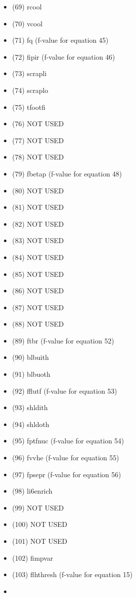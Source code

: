 \documentclass[
]{article}
\begin{document}
\begin{itemize}
\begin{itemize}
    (68) fptemp (f-value for equation 44)
  \item
    (69) rcool
  \item
    (70) vcool
  \item
    (71) fq (f-value for equation 45)
  \item
    (72) fipir (f-value for equation 46)
  \item
    (73) scrapli
  \item
    (74) scraplo
  \item
    (75) tfootfi
  \item
    (76) NOT USED
  \item
    (77) NOT USED
  \item
    (78) NOT USED
  \item
    (79) fbetap (f-value for equation 48)
  \item
    (80) NOT USED
  \item
    (81) NOT USED
  \item
    (82) NOT USED
  \item
    (83) NOT USED
  \item
    (84) NOT USED
  \item
    (85) NOT USED
  \item
    (86) NOT USED
  \item
    (87) NOT USED
  \item
    (88) NOT USED
  \item
    (89) ftbr (f-value for equation 52)
  \item
    (90) blbuith
  \item
    (91) blbuoth
  \item
    (92) fflutf (f-value for equation 53)
  \item
    (93) shldith
  \item
    (94) shldoth
  \item
    (95) fptfnuc (f-value for equation 54)
  \item
    (96) fvvhe (f-value for equation 55)
  \item
    (97) fpsepr (f-value for equation 56)
  \item
    (98) li6enrich
  \item
    (99) NOT USED
  \item
    (100) NOT USED
  \item
    (101) NOT USED
  \item
    (102) fimpvar
  \item
    (103) flhthresh (f-value for equation 15)
  \item

\end{itemize}
\end{itemize}
\end{document}
